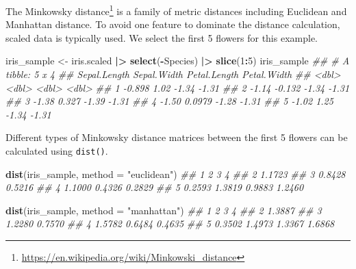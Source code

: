 \documentclass[
  notitlepage]{book}
\newenvironment{Shaded}{\begin{snugshade}}{\end{snugshade}}
\newcommand{\CommentTok}[1]{\textcolor[rgb]{0.56,0.35,0.01}{\textit{#1}}}
\newcommand{\DataTypeTok}[1]{\textcolor[rgb]{0.13,0.29,0.53}{#1}}
\newcommand{\DecValTok}[1]{\textcolor[rgb]{0.00,0.00,0.81}{#1}}
\newcommand{\ErrorTok}[1]{\textcolor[rgb]{0.64,0.00,0.00}{\textbf{#1}}}
\newcommand{\KeywordTok}[1]{\textcolor[rgb]{0.13,0.29,0.53}{\textbf{#1}}}
\newcommand{\NormalTok}[1]{#1}
\newcommand{\OperatorTok}[1]{\textcolor[rgb]{0.81,0.36,0.00}{\textbf{#1}}}
\newcommand{\StringTok}[1]{\textcolor[rgb]{0.31,0.60,0.02}{#1}}
\DeclareRobustCommand{\href}[2]{#2\footnote{\url{#1}}}
\begin{document}
The \href{https://en.wikipedia.org/wiki/Minkowski_distance}{Minkowsky
distance} is a family
of metric distances including Euclidean and Manhattan distance. To avoid
one feature to dominate the distance calculation, scaled data is
typically used. We select the first 5 flowers for this example.

\begin{Shaded}
\begin{Highlighting}[]
\NormalTok{iris\_sample \textless{}{-}}\StringTok{ }\NormalTok{iris.scaled }\OperatorTok{|}\ErrorTok{\textgreater{}}\StringTok{ }
\StringTok{  }\KeywordTok{select}\NormalTok{(}\OperatorTok{{-}}\NormalTok{Species) }\OperatorTok{|}\ErrorTok{\textgreater{}}\StringTok{ }
\StringTok{  }\KeywordTok{slice}\NormalTok{(}\DecValTok{1}\OperatorTok{:}\DecValTok{5}\NormalTok{)}
\NormalTok{iris\_sample}
\CommentTok{\#\# \# A tibble: 5 x 4}
\CommentTok{\#\#   Sepal.Length Sepal.Width Petal.Length Petal.Width}
\CommentTok{\#\#          \textless{}dbl\textgreater{}       \textless{}dbl\textgreater{}        \textless{}dbl\textgreater{}       \textless{}dbl\textgreater{}}
\CommentTok{\#\# 1       {-}0.898      1.02          {-}1.34       {-}1.31}
\CommentTok{\#\# 2       {-}1.14      {-}0.132         {-}1.34       {-}1.31}
\CommentTok{\#\# 3       {-}1.38       0.327         {-}1.39       {-}1.31}
\CommentTok{\#\# 4       {-}1.50       0.0979        {-}1.28       {-}1.31}
\CommentTok{\#\# 5       {-}1.02       1.25          {-}1.34       {-}1.31}
\end{Highlighting}
\end{Shaded}

Different types of Minkowsky distance matrices between the first 5
flowers can be calculated using \texttt{dist()}.

\begin{Shaded}
\begin{Highlighting}[]
\KeywordTok{dist}\NormalTok{(iris\_sample, }\DataTypeTok{method =} \StringTok{"euclidean"}\NormalTok{)}
\CommentTok{\#\#        1      2      3      4}
\CommentTok{\#\# 2 1.1723                     }
\CommentTok{\#\# 3 0.8428 0.5216              }
\CommentTok{\#\# 4 1.1000 0.4326 0.2829       }
\CommentTok{\#\# 5 0.2593 1.3819 0.9883 1.2460}
\end{Highlighting}
\end{Shaded}

\begin{Shaded}
\begin{Highlighting}[]
\KeywordTok{dist}\NormalTok{(iris\_sample, }\DataTypeTok{method =} \StringTok{"manhattan"}\NormalTok{)}
\CommentTok{\#\#        1      2      3      4}
\CommentTok{\#\# 2 1.3887                     }
\CommentTok{\#\# 3 1.2280 0.7570              }
\CommentTok{\#\# 4 1.5782 0.6484 0.4635       }
\CommentTok{\#\# 5 0.3502 1.4973 1.3367 1.6868}
\end{Highlighting}
\end{Shaded}
\end{document}
